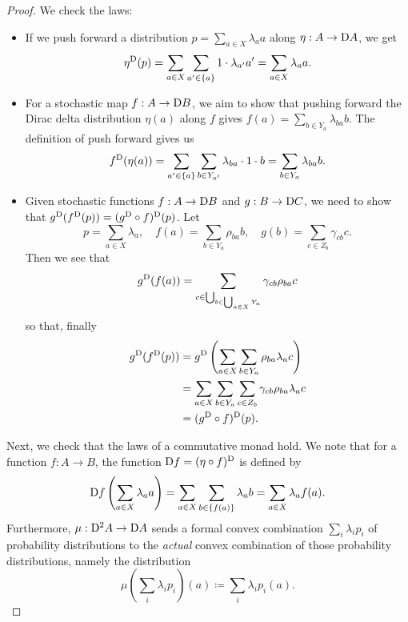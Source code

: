 \documentclass[DynamicalBook]{subfiles}
\begin{document}
\begin{proof}
  We check the laws:
  \begin{itemize}
  \item If we push forward a distribution $p = \sum_{a \in X}\lambda_a a$ along
    $\eta : A \to \mathrm{D} A$, we get
    \[
    \eta^{\mathrm{D}}(p) = \sum_{a \in X} \sum_{a' \in \{a\}} 1\cdot
    \lambda_{a'}  a' = \sum_{a \in X}\lambda_a a.
\]
  \item For a stochastic map $f : A \to \mathrm{D} B$, we aim to show that pushing
    forward the Dirac delta distribution $\eta(a)$ along $f$ gives $f(a) =
    \sum_{b \in Y_a} \lambda_{b a} b$. The definition of push forward gives us
    \[
f^{\mathrm{D}}(\eta(a)) = \sum_{a' \in \{a\}}\sum_{b \in Y_{a'}}
\lambda_{ba} \cdot 1 \cdot b = \sum_{b \in Y_a} \lambda_{ba} b.
    \]
   \item Given stochastic functions $f : A \to \mathrm{D} B$ and $g : B \to
     \mathrm{D} C$, we need to show that $g^{\mathrm{D}}(f^{\mathrm{D}}(p)) =
     (g^{\mathrm{D}}\circ f)^{\mathrm{D}}(p)$. Let
          \[
          p = \sum_{a \in X} \lambda_{a},  \quad
          f(a) = \sum_{b \in Y_a} \rho_{ba} b, \quad
g(b) = \sum_{c \in Z_b} \gamma_{cb} c.
          \]
       Then we see that
       \[
g^{\mathrm{D}}(f(a)) = \sum_{c \in \bigcup_{b \in \bigcup_{a \in X} Y_a }} \gamma_{cb} \rho_{ba} c
       \]
       so that, finally
\begin{align*}
  g^{\mathrm{D}}(f^{\mathrm{D}}(p)) &= g^{\mathrm{D}}\left( \sum_{a \in X} \sum_{b \in Y_a} \rho_{ba} \lambda_a c \right) \\
                                &=  \sum_{a \in X} \sum_{b \in Y_a} \sum_{c \in Z_b} \gamma_{cb} \rho_{ba} \lambda_a c \\
  &= (g^{\mathrm{D}}\circ f)^{\mathrm{D}}(p). 
\end{align*}
  \end{itemize}

  Next, we check that the laws of a commutative monad hold. We note that for a
  function $f : A \to B$, the function $\mathrm{D} f = (\eta \circ
  f)^{\mathrm{D}}$ is defined by
  \[\mathrm{D} f\left( \sum_{a \in X} \lambda_a a \right) = \sum_{a \in X} \sum_{b
    \in \{f(a)\}} \lambda_a b = \sum_{a \in X} \lambda_a f(a).\]
  Furthermore, $\mu : \mathrm{D}^2 A \to \mathrm{D} A$ sends a formal convex
  combination $\sum_i \lambda_i p_i$ of probability distributions to the
  \emph{actual} convex combination of those probability distributions, namely
  the distribution
  \[
\mu\left( \sum_i \lambda_i p_i \right)(a) \coloneqq \sum_i \lambda_i p_i(a).
  \]
  

\end{proof}
\end{document}
